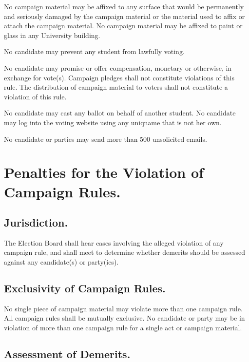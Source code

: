 No campaign material may be affixed to any surface that would be permanently and seriously damaged by the campaign material or the material used to affix or attach the campaign material. No campaign material may be affixed to paint or glass in any University building. 

No candidate may prevent any student from lawfully voting.

No candidate may promise or offer compensation, monetary or otherwise, in exchange for vote(s).  Campaign pledges shall not constitute violations of this rule. The distribution of campaign material to voters shall not constitute a violation of this rule.

No candidate may cast any ballot on behalf of another student. No candidate may log into the voting website using any uniqname that is not her own.

No candidate or parties may send more than 500 unsolicited emails.


\section{Penalties for the Violation of Campaign Rules.}

\subsection{Jurisdiction.}
The Election Board shall hear cases involving the alleged violation of any campaign rule, and shall meet to determine whether demerits should be assessed against any candidate(s) or party(ies).

\subsection{Exclusivity of Campaign Rules.}
No single piece of campaign material may violate more than one campaign rule.  All campaign rules shall be mutually exclusive.  No candidate or party may be in violation of more than one campaign rule for a single act or campaign material.
 
\subsection{Assessment of Demerits.}

